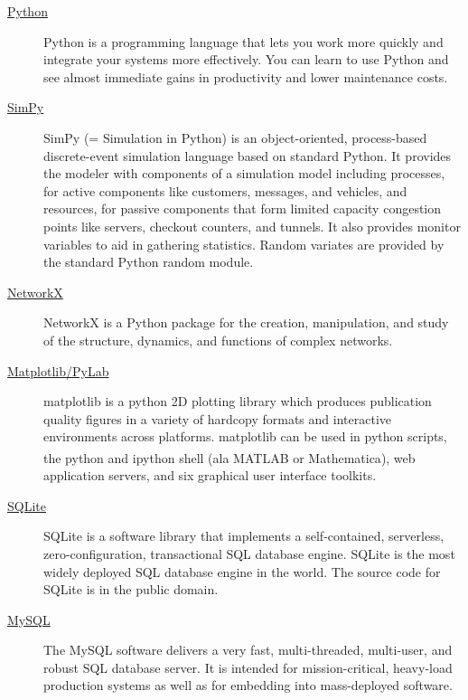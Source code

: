 \documentclass[11pt,letterpaper,onecolumn,twoside,openright,final]{report}
\begin{document}
\begin{description}
\item[\href{http://www.python.org/}{Python}]Python is a programming language that lets you work more quickly and integrate your systems more effectively.
You can learn to use Python and see almost immediate gains in productivity and lower maintenance costs.

\item[\href{http://simpy.sourceforge.net/}{SimPy}]SimPy (= Simulation in Python) is an object-oriented, process-based discrete-event simulation language based on standard Python.
It provides the modeler with components of a simulation model including processes, for active components like customers, messages, and vehicles, and resources, for passive components that form limited capacity congestion points like servers, checkout counters, and tunnels.
It also provides monitor variables to aid in gathering statistics.
Random variates are provided by the standard Python random module.

\item[\href{http://networkx.lanl.gov/}{NetworkX}]
NetworkX is a Python package for the creation, manipulation, and study of the structure, dynamics, and functions of complex networks.

\item[\href{http://matplotlib.sourceforge.net/}{Matplotlib/PyLab}]
matplotlib is a python 2D plotting library which produces publication quality figures in a variety of hardcopy formats and interactive environments across platforms.
matplotlib can be used in python scripts, the python and ipython shell (ala MATLAB\textsuperscript{\tiny{\textregistered}} or Mathematica\textsuperscript{\tiny{\textregistered}}), web application servers, and six graphical user interface toolkits.

\item[\href{http://www.sqlite.org/}{SQLite}]
SQLite is a software library that implements a self-contained, serverless, zero-configuration, transactional SQL database engine.
SQLite is the most widely deployed SQL database engine in the world.
The source code for SQLite is in the public domain.

\item[\href{http://www.mysql.com/}{MySQL}]
The MySQL software delivers a very fast, multi-threaded, multi-user, and robust SQL database server.
It is intended for mission-critical, heavy-load production systems as well as for embedding into mass-deployed software.


\end{description}
\end{document}
